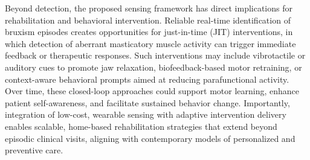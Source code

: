 \documentclass[acmtog, nonacm]{acmart}
\begin{document}
Beyond detection, the proposed sensing framework has direct implications for rehabilitation and behavioral intervention. Reliable real-time identification of bruxism episodes creates opportunities for just-in-time (JIT) interventions, in which detection of aberrant masticatory muscle activity can trigger immediate feedback or therapeutic responses. Such interventions may include vibrotactile or auditory cues to promote jaw relaxation, biofeedback-based motor retraining, or context-aware behavioral prompts aimed at reducing parafunctional activity. Over time, these closed-loop approaches could support motor learning, enhance patient self-awareness, and facilitate sustained behavior change. Importantly, integration of low-cost, wearable sensing with adaptive intervention delivery enables scalable, home-based rehabilitation strategies that extend beyond episodic clinical visits, aligning with contemporary models of personalized and preventive care.




\end{document}
